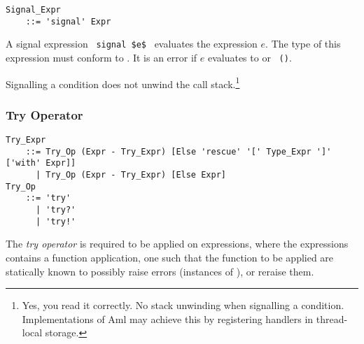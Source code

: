 \grammar\begin{lstlisting}
Signal_Expr 
    ::= 'signal' Expr
\end{lstlisting}

A signal expression ~\lstinline!signal $e$!~ evaluates the expression $e$. The type of this expression must conform to . It is an error if $e$ evaluates to  or ~\lstinline!()!.

Signalling a condition does not unwind the call stack.\footnote{Yes, you read it correctly. No stack unwinding when signalling a condition. Implementations of Aml may achieve this by registering handlers in thread-local storage.}





\subsubsection{Try Operator}
\label{sec:try-operator}

\grammar\begin{lstlisting}
Try_Expr 
    ::= Try_Op (Expr - Try_Expr) [Else 'rescue' '[' Type_Expr ']' ['with' Expr]]
      | Try_Op (Expr - Try_Expr) [Else Expr]
Try_Op
    ::= 'try'
      | 'try?'
      | 'try!'
\end{lstlisting}

The {\em try operator} is required to be applied on expressions, where the expressions contains a function application, one such that the function to be applied are statically known to possibly raise errors (instances of ), or reraise them. 

